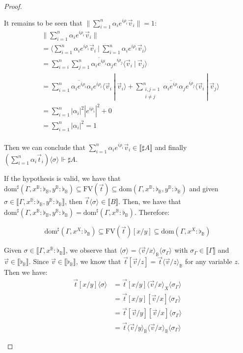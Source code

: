 \documentclass[a4paper,UKenglish,numberwithinsect,pdfa,anonymous]{lipics-v2021}
\theoremstyle{restatestyle}
\newcommand\ansubst[2]{\ensuremath{\langle #1 \rangle_{#2}}}
\newcommand\dom[1]{\mathrm{dom}(#1)}
\newcommand\sdom[1]{\mathrm{dom}^{\sharp}(#1)}
\newcommand\FV[1]{\mathrm{FV}(#1)}
\def\scal#1#2{\langle{#1}~|~{#2}\rangle}
\def\BB{\mathbb{B}}
\def\sem#1{\llbracket#1\rrbracket}
\def\real{\Vdash}
\newcommand\basis[1]{\ensuremath{\flat_{#1}}}
\begin{document}
\begin{proof}
\begin{description}
    It remains to be seen that $\|\sum_{i=1}^{n} \alpha_i e^{i\rho_i} \vec{v}_{i}\|=1$:
    \begin{align*}
    &\|\sum_{i=1}^{n} \alpha_i e^{i\rho_i} \vec{v}_{i}\| \\
    &=\scal{\sum_{i=1}^{n} \alpha_i e^{i\rho_i}\vec{v}_{i}}{\sum_{i=1}^{n} \alpha_i e^{i\rho_i} \vec{v}_{i}}\\
    &= \sum_{i=i}^{n}\sum_{j=1}^{n} \overline{\alpha_i e^{i\rho_i}}\alpha_j e^{i\rho_j} \scal{\vec{v}_{i}}{\vec{v}_{j}}\\
    &=\sum_{i=1}^{n} \overline{\alpha_i e^{i\rho_i}}\alpha_i e^{i\rho_i} \scal{\vec{v}_{i}}{\vec{v}_{i}} + \sum_{\substack{i,j=1\\i\neq j}}^{n} \overline{\alpha_i e^{i\rho_i}}\alpha_j e^{i\rho_j} \scal{\vec{v}_{i}}{\vec{v}_{j}}\\
    &=\sum_{i=1}^{n}|\alpha_i|^2 |e^{i\rho_i}|^2+ 0\\
    &=\sum_{i=1}^{n}|\alpha_i|^2 = 1\\
    \end{align*}

    Then we can conclude that $\sum_{i=1}^{n}\alpha_i e^{i\rho_i}\vec{v}_{i}\in\sem{\sharp A}$ and finally $(\sum_{i=1}^{n}\alpha_i\vec{t}_{i})\ansubst{\sigma}{}\real\sharp A$.

    \item[Contr] If the hypothesis is valid, we have that $\sdom{\Gamma, x^\BB:\basis{\BB}, y^\BB:\basis{\BB}}\subseteq\FV{\vec{t}}\subseteq\dom{\Gamma,x^\BB:\basis{\BB}, y^\BB:\basis{\BB}}$ and given $\sigma\in\sem{\Gamma, x^\BB:\basis{\BB}, y^\BB:\basis{\BB}}$, then $\vec{t}\ansubst{\sigma}{}\in\sem{B}$. Then, we have that $\sdom{\Gamma, x^\BB:\basis{\BB}, y^\BB:\basis{\BB}}=\sdom{\Gamma, x^\BB:\basis{\BB}}$. Therefore:
    
    \[
    \sdom{\Gamma, x^X:\basis{\BB}}\subseteq\FV{\vec{t}}[x/y]\subseteq\dom{\Gamma, x^X:\basis{\BB}}
    \]

    Given $\sigma\in\sem{\Gamma, x^\BB:\basis{\BB}}$, we observe that $\ansubst{\sigma}{}=\ansubst{\vec{v}/x}{\BB}\ansubst{\sigma_\Gamma}{}$ with $\sigma_\Gamma\in\sem{\Gamma}$ and $\vec{v}\in\sem{\basis{\BB}}$. Since $\vec{v}\in\sem{\basis{\BB}}$, we know that $\vec{t}[\vec v/z] =\vec{t}\ansubst{\vec{v}/z}{\BB}$ for any variable $z$. Then we have:
    \begin{align*}
        \vec{t}[x/y]\ansubst{\sigma}{} &= \vec{t}[x/y]\ansubst{\vec{v}/x}{X}\ansubst{\sigma_\Gamma}{}\\
        &=\vec{t}[x/y][\vec{v}/x]\ansubst{\sigma_\Gamma}{}\\
        &=\vec{t}[\vec{v}/y][\vec{v}/x]\ansubst{\sigma_\Gamma}{}\\
        &=\vec{t}\ansubst{\vec{v}/y}{\BB}\ansubst{\vec{v}/x}{\BB}\ansubst{\sigma_\Gamma}{}    
    \end{align*}
    

\end{description}
\end{proof}
\end{document}
